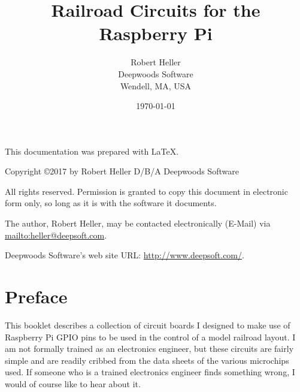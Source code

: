 \documentclass[12pt,notitlepage,twoside]{book}
\begin{document}
\title{Railroad Circuits for the Raspberry Pi}
\author{Robert Heller \\ Deepwoods Software \\ Wendell, MA, USA}
\date{\today}
\begin{titlepage}

\maketitle

\clearpage

This documentation was prepared with \LaTeX.

\vspace{.25in}


{\small Copyright \copyright 2017 by Robert Heller D/B/A Deepwoods Software}
\vspace{.25in}

All rights reserved.  Permission is granted to copy this document in
electronic form only, so long as it is with the software it
documents. 

\vspace{.125in}

The author, Robert Heller, may be contacted electronically (E-Mail) via
\url{mailto:heller@deepsoft.com}.

\vspace{.25in}

Deepwoods Software's web site URL: \url{http://www.deepsoft.com/}.

\thispagestyle{empty}
\setcounter{page}{0}
\clearpage

\end{titlepage}

\tableofcontents
\listoffigures
\listoftables
\cleardoublepage
\chapter*{Preface}

This booklet describes a collection of circuit boards I designed to make use 
of Raspberry Pi GPIO pins to be used in the control of a model railroad 
layout.  I am not formally trained as an electronics engineer, but these 
circuits are fairly simple and are readily cribbed from the data sheets of the 
various microchips used.  If someone who is a trained electronics engineer 
finds something wrong, I would of course like to hear about it.

\cleardoublepage
{}
\end{document}
